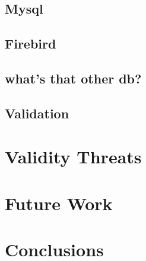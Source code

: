 \documentclass{report}
\begin{document}
\subsection{Mysql}
\subsection{Firebird}
\subsection{ what's that other db?}
\subsection{Validation}
\section{Validity Threats}
\section{ Future Work}
\section{Conclusions}




\end{document}
